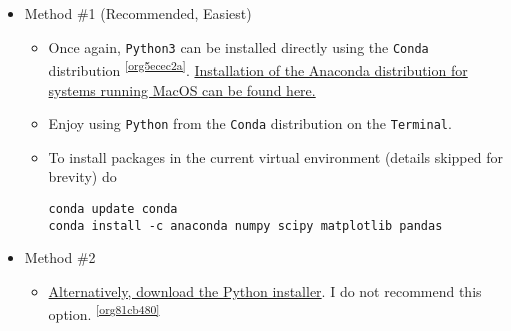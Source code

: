 \documentclass[11pt]{article}
\begin{document}
\begin{itemize}
\item Method \#1 (Recommended, Easiest)
\label{sec:org002596f}
\begin{itemize}
\item Once again, \texttt{Python3} can be installed directly using the \texttt{Conda} distribution \textsuperscript{\cref{org5ecec2a}}. \href{https://www.anaconda.com/download/\#macos}{Installation of the Anaconda distribution for systems running MacOS can be found here.}
\item Enjoy using \texttt{Python} from the \texttt{Conda} distribution on the \texttt{Terminal}.
\item To install packages in the current virtual environment (details skipped for
brevity) do
\begin{verbatim}
conda update conda
conda install -c anaconda numpy scipy matplotlib pandas
\end{verbatim}
\end{itemize}

\item Method \#2
\label{sec:org554ef93}
\begin{itemize}
\item \href{https://www.python.org/downloads/mac-osx/}{Alternatively, download the Python installer}. I do not recommend this
option. \textsuperscript{\cref{org81cb480}}
\end{itemize}


\end{itemize}
\end{document}
